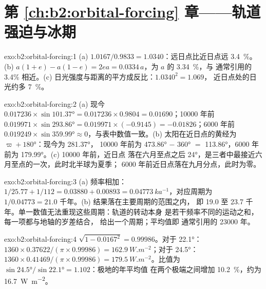 \section*{第 \ref{ch:b2:orbital-forcing} 章——轨道强迫与冰期}

\begin{solution}{exo:b2:orbital-forcing:1}
(a) $1.0167/0.9833 = 1.0340$：远日点比近日点远 \qty{3.4}{\percent}。
(b) $a(1 + e) - a(1 - e) = 2ea = 0.0334\,a$，为 $a$ 的 \qty{3.34}{\percent}，与
通常引用的 3.4\% 相近。(c) 日光强度与距离的平方成反比：$1.0340^2 = 1.069$，
近日点处的日光约多 \qty{7}{\percent}。
\end{solution}

\begin{solution}{exo:b2:orbital-forcing:2}
(a) 现今 $0.017236 \times \sin\ang{101.37} = 0.017236 \times 0.9804 = 0.01690$；\num{10000} 年前
$0.019971 \times \sin\ang{293.86} = 0.019971 \times (-0.9145) = -0.01826$；\num{6000} 年前
$0.019249 \times \sin\ang{359.99} \approx 0$，与表中数值一致。(b) 太阳在近日点的黄经为
$\varpi + \ang{180}$：现今为 \ang{281.37}，
\num{10000} 年前为 \ang{473.86} $-$ \ang{360} $=$ \ang{113.86}，\num{6000} 年前为 \ang{179.99}。(c) \num{10000} 年前，近日点
落在六月至点之后 \ang{24}，是三者中最接近六月至点的一次，此时北半球为夏季；
\num{6000} 年前近日点落在九月分点，此时为零。
\end{solution}

\begin{solution}{exo:b2:orbital-forcing:3}
(a) 频率相加：$1/25.77 + 1/112 = 0.03880 + 0.00893 = \qty{0.04773}{ka^{-1}}$，对应周期为
$1/0.04773 = 21.0$ 千年。(b) 结果落在主要周期的范围之内，
即 19.0 至 23.7 千年。单一数值无法重现这些周期：轨道的转动本身
是若干频率不同的运动之和，每一项都与地轴的岁差结合，
给出一个周期；平均值即
通常引用的 \num{23000} 年。
\end{solution}

\begin{solution}{exo:b2:orbital-forcing:4}
$\sqrt{1 - 0.0167^2} = 0.99986$。对于 \ang{22.1}：$1360 \times 0.37622/(\pi \times 0.99986) =
\qty{162.9}{W.m^{-2}}$；对于 \ang{24.5}：$1360 \times 0.41469/(\pi \times 0.99986) =
\qty{179.5}{W.m^{-2}}$。比值为 $\sin\ang{24.5}/\sin\ang{22.1} = 1.102$：极地的年平均值
在两个极端之间增加 \qty{10.2}{\percent}，约为 \qty{16.7}{W.m^{-2}}。
\end{solution}

